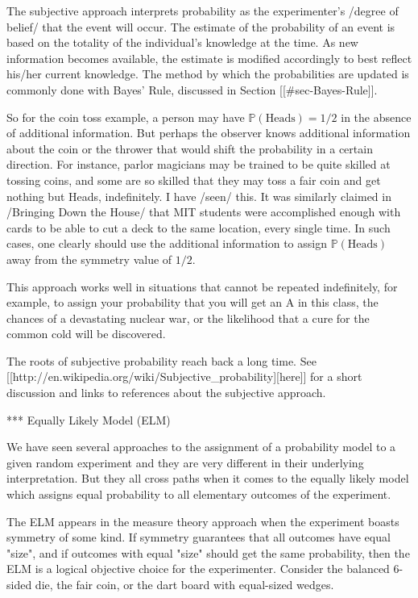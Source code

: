 The subjective approach interprets probability as the experimenter's
/degree of belief/ that the event will occur. The estimate of the
probability of an event is based on the totality of the individual's
knowledge at the time. As new information becomes available, the
estimate is modified accordingly to best reflect his/her current
knowledge. The method by which the probabilities are updated is
commonly done with Bayes' Rule, discussed in Section [[#sec-Bayes-Rule]].

So for the coin toss example, a person may have
\(\mathbb{P}(\mbox{Heads})=1/2\) in the absence of additional
information. But perhaps the observer knows additional information
about the coin or the thrower that would shift the probability in a
certain direction. For instance, parlor magicians may be trained to be
quite skilled at tossing coins, and some are so skilled that they may
toss a fair coin and get nothing but Heads, indefinitely. I have
/seen/ this. It was similarly claimed in /Bringing Down the House/
\cite{Mezrich2003} that MIT students were accomplished enough with
cards to be able to cut a deck to the same location, every single
time. In such cases, one clearly should use the additional information
to assign \(\mathbb{P}(\mbox{Heads})\) away from the symmetry value of
\(1/2\).

This approach works well in situations that cannot be repeated
indefinitely, for example, to assign your probability that you will
get an A in this class, the chances of a devastating nuclear war, or
the likelihood that a cure for the common cold will be discovered.

The roots of subjective probability reach back a long time. See [[http://en.wikipedia.org/wiki/Subjective_probability][here]]
for a short discussion and links to references about the subjective
approach.

*** Equally Likely Model (ELM)

We have seen several approaches to the assignment of a probability
model to a given random experiment and they are very different in
their underlying interpretation. But they all cross paths when it
comes to the equally likely model which assigns equal probability to
all elementary outcomes of the experiment.

The ELM appears in the measure theory approach when the experiment
boasts symmetry of some kind. If symmetry guarantees that all outcomes
have equal "size", and if outcomes with equal "size" should get
the same probability, then the ELM is a logical objective choice for
the experimenter. Consider the balanced 6-sided die, the fair coin, or
the dart board with equal-sized wedges.

